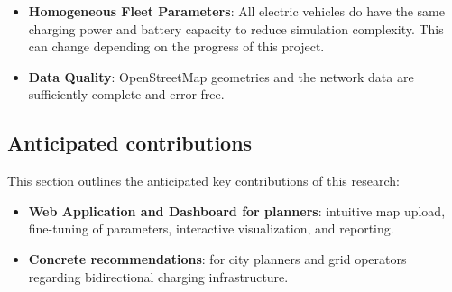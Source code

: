 \begin{itemize}
    \item \textbf{Homogeneous Fleet Parameters}: All electric vehicles do have the same charging power and battery capacity to reduce simulation complexity. This can change depending on the progress of this project.
    \item \textbf{Data Quality}: OpenStreetMap geometries and the network data are sufficiently complete and error-free.
\end{itemize}

\newpage
\subsection{Anticipated contributions}
This section outlines the anticipated key contributions of this research:

\begin{itemize}
    \item \textbf{Web Application and Dashboard for planners}: intuitive map upload, fine-tuning of parameters, interactive visualization, and reporting.
    \item \textbf{Concrete recommendations}: for city planners and grid operators regarding bidirectional charging infrastructure.
\end{itemize}